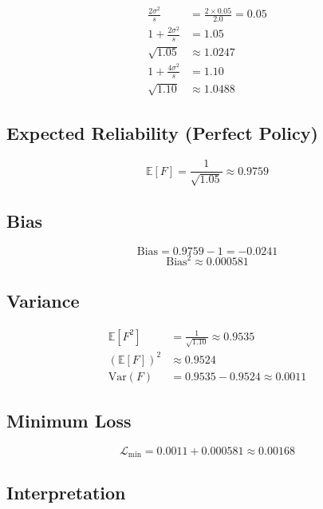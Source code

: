 \documentclass[11pt,a4paper]{article}
\theoremstyle{definition}
\newcommand{\E}{\mathbb{E}}
\newcommand{\Var}{\mathrm{Var}}
\begin{document}
\begin{align}
    \frac{2\sigma^2}{s} &= \frac{2 \times 0.05}{2.0} = 0.05 \\
    1 + \frac{2\sigma^2}{s} &= 1.05 \\
    \sqrt{1.05} &\approx 1.0247 \\
    1 + \frac{4\sigma^2}{s} &= 1.10 \\
    \sqrt{1.10} &\approx 1.0488
\end{align}

\subsection{Expected Reliability (Perfect Policy)}

\begin{equation}
    \E[F] = \frac{1}{\sqrt{1.05}} \approx 0.9759
\end{equation}

\subsection{Bias}

\begin{equation}
    \mathrm{Bias} = 0.9759 - 1 = -0.0241
\end{equation}
\begin{equation}
    \mathrm{Bias}^2 \approx 0.000581
\end{equation}

\subsection{Variance}

\begin{align}
    \E[F^2] &= \frac{1}{\sqrt{1.10}} \approx 0.9535 \\
    (\E[F])^2 &\approx 0.9524 \\
    \Var(F) &= 0.9535 - 0.9524 \approx 0.0011
\end{align}

\subsection{Minimum Loss}

\begin{equation}
    \mathcal{L}_{\min} = 0.0011 + 0.000581 \approx 0.00168
\end{equation}

\subsection{Interpretation}
\end{document}
